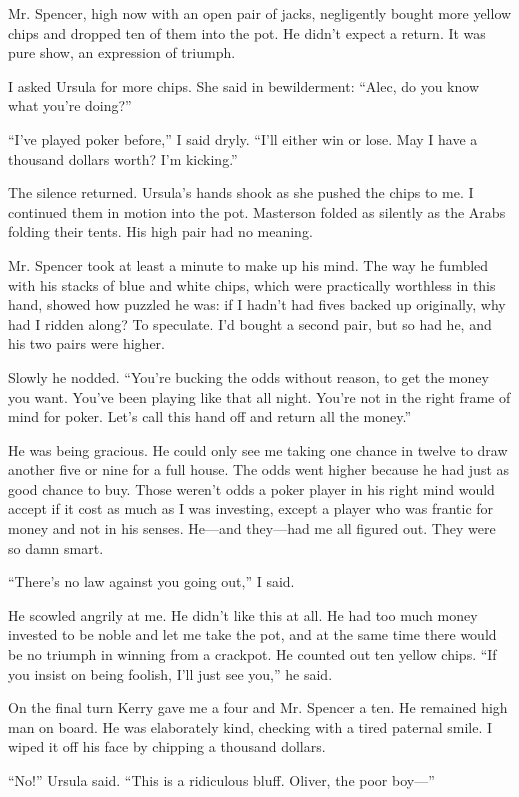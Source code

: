 \documentclass{novel}
\begin{document}
Mr. Spencer, high now with an open pair of jacks, negligently bought more yellow chips and dropped ten of them into the pot. He didn’t expect a return. It was pure show, an expression of triumph.

I asked Ursula for more chips. She said in bewilderment: “Alec, do you know what you’re doing?”

“I’ve played poker before,” I said dryly. “I’ll either win or lose. May I have a thousand dollars worth? I’m kicking.”

The silence returned. Ursula’s hands shook as she pushed the chips to me. I continued them in motion into the pot. Masterson folded as silently as the Arabs folding their tents. His high pair had no meaning.

Mr. Spencer took at least a minute to make up his mind. The way he fumbled with his stacks of blue and white chips, which were practically worthless in this hand, showed how puzzled he was: if I hadn’t had fives backed up originally, why had I ridden along? To speculate. I’d bought a second pair, but so had he, and his two pairs were higher.

Slowly he nodded. “You’re bucking the odds without reason, to get the money you want. You’ve been playing like that all night. You’re not in the right frame of mind for poker. Let’s call this hand off and return all the money.”

He was being gracious. He could only see me taking one chance in twelve to draw another five or nine for a full house. The odds went higher because he had just as good chance to buy. Those weren’t odds a poker player in his right mind would accept if it cost as much as I was investing, except a player who was frantic for money and not in his senses. He—and they—had me all figured out. They were so damn smart.

“There’s no law against you going out,” I said.

He scowled angrily at me. He didn’t like this at all. He had too much money invested to be noble and let me take the pot, and at the same time there would be no triumph in winning from a crackpot. He counted out ten yellow chips. “If you insist on being foolish, I’ll just see you,” he said.

On the final turn Kerry gave me a four and Mr. Spencer a ten. He remained high man on board. He was elaborately kind, checking with a tired paternal smile. I wiped it off his face by chipping a thousand dollars.

“No!” Ursula said. “This is a ridiculous bluff. Oliver, the poor boy—”
\end{document}
